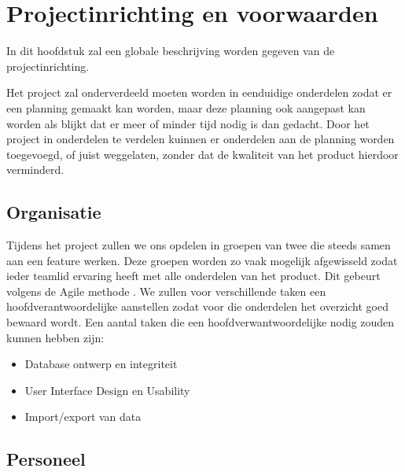 \section{Projectinrichting en voorwaarden}
\label{projectinrichting}

In dit hoofdstuk zal een globale beschrijving worden gegeven van de projectinrichting. 

Het project zal onderverdeeld moeten worden in eenduidige onderdelen zodat er een planning gemaakt kan worden,
maar deze planning ook aangepast kan worden als blijkt dat er meer of minder tijd nodig is dan gedacht.
Door het project in onderdelen te verdelen kuinnen er onderdelen aan de planning worden toegevoegd,
of juist weggelaten, zonder dat de kwaliteit van het product hierdoor verminderd.


\subsection{Organisatie}

Tijdens het project zullen we ons opdelen in groepen van twee die steeds samen aan een feature werken.
Deze groepen worden zo vaak mogelijk afgewisseld zodat ieder teamlid ervaring heeft met alle onderdelen van het product. Dit gebeurt volgens de Agile methode \cite{wiki:agile}.
We zullen voor verschillende taken een hoofdverantwoordelijke aanstellen zodat voor die onderdelen het overzicht goed bewaard wordt.
Een aantal taken die een hoofdverwantwoordelijke nodig zouden kunnen hebben zijn:
\begin{itemize}
    \item Database ontwerp en integriteit
    \item User Interface Design en Usability
    \item Import/export van data
\end{itemize}


\subsection{Personeel}

